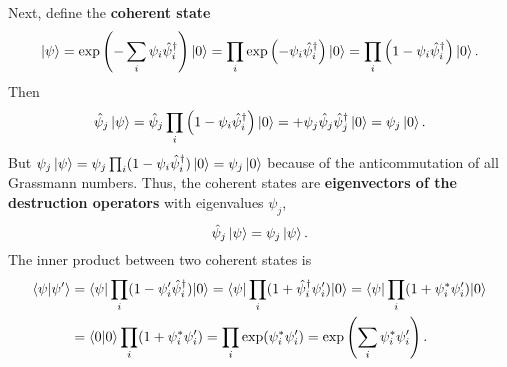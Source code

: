 Next, define the \textbf{coherent state}
\begin{equation}
	\ket{\psi} = \exp \left( -\sum_i \psi_i \hat\psi^\dagger_i \right) \ket{0} = \prod_i \exp \left( -\psi_i \hat\psi^\dagger_i \right) \ket{0} = \prod_i \left( 1 - \psi_i \hat\psi^\dagger_i \right) \ket{0} .
\end{equation}
Then
\begin{equation}
	\hat\psi_j \ket{\psi} = \hat\psi_j \prod_i \left( 1 - \psi_i \hat\psi^\dagger_i \right) \ket{0} = + \psi_j \hat\psi_j \hat\psi^\dagger_j \ket{0} = \psi_j \ket{0} .
\end{equation}
But $\psi_j \ket{\psi} = \psi_j \prod_i (1 - \psi_i \hat\psi^\dagger_i) \ket{0} = \psi_j \ket{0}$ because of the anticommutation  of all Grassmann numbers.
Thus, the coherent states are \textbf{eigenvectors of the destruction operators} with eigenvalues $\psi_j$,
\begin{equation}
	\hat\psi_j \ket{\psi} = \psi_j \ket{\psi} .
\end{equation}
The inner product between two coherent states is
\begin{equation}
\begin{split}
	\iffalse
	\braket{\psi | \psi'} &= \braket{0 | \prod_i (1 - \destr_i \conj\psi_i) \prod_j (1 - \psi'_j \creat_j) | 0} \\
	                      &= \braket{0 | 0} + \sum_{i,j} \braket{0 | \destr_i \conj\psi_i \psi'_j \creat_j | 0}
	                       = \braket{0 | 0} + \sum_{i,j} \conj\psi_i \psi'_j \braket{0 | \destr_i \creat_j | 0} \\
	                      &= \braket{0 | 0} + \sum_{i  } \conj\psi_i \psi'_i
						   = 1 + \sum_i \conj\psi_i \psi'_i = \exp \left( \sum_i \conj\psi_i \psi'_i \right) .
	\fi
	\braket{\psi | \psi'} &= \braket{\psi | \prod_i (1 - \psi'_i \creat_i) | 0} = \braket{\psi | \prod_i (1 + \creat_i \psi'_i) | 0} = \braket{\psi | \prod_i (1 + \conj\psi_i \psi'_i) | 0} \\
						  &= \braket{0 | 0} \prod_i (1 + \conj\psi_i \psi'_i) = \prod_i \exp(\conj\psi_i \psi'_i) = \exp \left( \sum_i \conj\psi_i \psi'_i \right) .
\end{split}
\end{equation}

